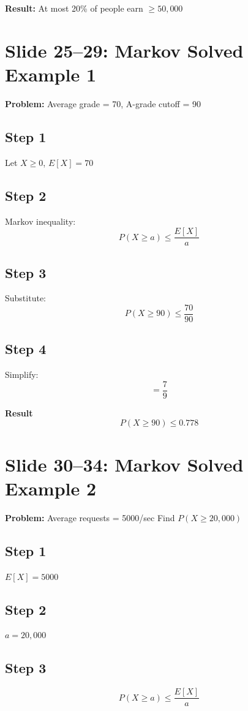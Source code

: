 \documentclass[12pt]{article}
\begin{document}
\textbf{Result:}  
At most 20\% of people earn $\ge 50,000$  

\section*{Slide 25–29: Markov Solved Example 1}
\textbf{Problem:}  
Average grade = 70, A-grade cutoff = 90  

\subsection*{Step 1}
Let \( X \ge 0 \), \( E[X] = 70 \)

\subsection*{Step 2}
Markov inequality:
\[
P(X \ge a) \le \frac{E[X]}{a}
\]

\subsection*{Step 3}
Substitute:
\[
P(X \ge 90) \le \frac{70}{90}
\]

\subsection*{Step 4}
Simplify:
\[
= \frac{7}{9}
\]

\textbf{Result}
\[
P(X \ge 90) \le 0.778
\]

\section*{Slide 30–34: Markov Solved Example 2}
\textbf{Problem:}  
Average requests = 5000/sec  
Find \( P(X \ge 20,000) \)

\subsection*{Step 1}
\( E[X] = 5000 \)

\subsection*{Step 2}
\( a = 20,000 \)

\subsection*{Step 3}
\[
P(X \ge a) \le \frac{E[X]}{a}
\]
\end{document}

